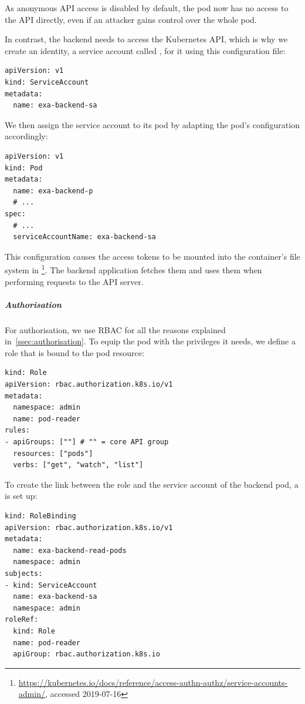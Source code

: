 As anonymous API access is disabled by default, the pod  now has no access to the API directly, even if an attacker gains control over the whole pod.

In contrast, the backend needs to access the Kubernetes API, which is why we create an identity, a service account called , for it using this configuration file:

\begin{verbatim}
apiVersion: v1
kind: ServiceAccount
metadata:
  name: exa-backend-sa
\end{verbatim}

We then assign the service account to its pod by adapting the pod's configuration accordingly:

\begin{verbatim}
apiVersion: v1
kind: Pod
metadata:
  name: exa-backend-p
  # ...
spec:
  # ...
  serviceAccountName: exa-backend-sa
\end{verbatim}

This configuration causes the access tokens to be mounted into the container's file system in \footnote{\url{https://kubernetes.io/docs/reference/access-authn-authz/service-accounts-admin/}, accessed 2019-07-16}. The backend application fetches them and uses them when performing requests to the API server.

\subparagraph{Authorisation}
For authorisation, we use \ac{RBAC} for all the reasons explained in~\ref{ssec:authorisation}. To equip the pod with the privileges it needs, we define a role that is bound to the pod resource:

\begin{verbatim}
kind: Role
apiVersion: rbac.authorization.k8s.io/v1
metadata:
  namespace: admin
  name: pod-reader
rules:
- apiGroups: [""] # "" = core API group
  resources: ["pods"]
  verbs: ["get", "watch", "list"]
\end{verbatim}

To create the link between the role and the service account of the backend pod, a  is set up: 

\begin{verbatim}
kind: RoleBinding
apiVersion: rbac.authorization.k8s.io/v1
metadata:
  name: exa-backend-read-pods
  namespace: admin
subjects:
- kind: ServiceAccount
  name: exa-backend-sa 
  namespace: admin
roleRef:
  kind: Role
  name: pod-reader
  apiGroup: rbac.authorization.k8s.io
\end{verbatim}

